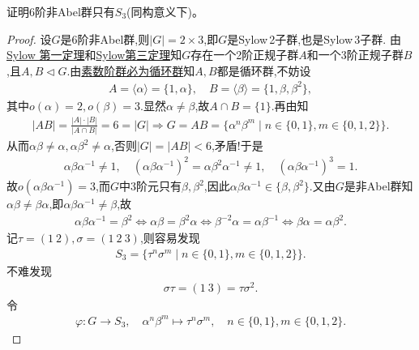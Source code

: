 \documentclass[../../main.tex]{subfiles}%
\begin{document}
\begin{example}
证明6阶非Abel群只有$S_3$(同构意义下)。
\end{example}
\begin{proof}

设$G$是6阶非Abel群,则$|G|=2\times 3$,即$G$是Sylow$\,$2子群,也是Sylow$\,$3子群.
由\hyperref[theorem:Sylow 第一定理]{Sylow 第一定理}和\hyperref[theorem:Sylow第三定理]{Sylow第三定理}知$G$存在一个2阶正规子群$A$和一个3阶正规子群$B$,且$A,B\lhd G$.由\hyperref[proposition:素数阶群必为循环群]{素数阶群必为循环群}知$A,B$都是循环群,不妨设
\begin{align*}
A=\langle \alpha \rangle =\{ 1,\alpha \} ,\quad B=\langle \beta \rangle =\{ 1,\beta ,\beta^2 \} ,
\end{align*}
其中$o(\alpha)=2,o(\beta)=3$.显然$\alpha \ne \beta$,故$A\cap B=\{ 1 \}$.再由知
\begin{align*}
|AB|=\frac{|A|\cdot |B|}{|A\cap B|}=6=|G|\Longrightarrow G=AB=\{ \alpha^n\beta^m\mid n\in \{ 0,1 \} ,m\in \{ 0,1,2 \} \} .
\end{align*}
从而$\alpha \beta \ne \alpha ,\alpha \beta^2\ne \alpha$,否则$|G|=|AB|<6$,矛盾!于是
\begin{align*}
\alpha \beta \alpha^{-1}\ne 1,\quad (\alpha \beta \alpha^{-1})^2=\alpha \beta^2\alpha^{-1}\ne 1,\quad (\alpha \beta \alpha^{-1})^3=1.
\end{align*}
故$o(\alpha \beta \alpha^{-1})=3$,而$G$中3阶元只有$\beta ,\beta^2$,因此$\alpha \beta \alpha^{-1}\in \{ \beta ,\beta^2 \} $.又由$G$是非Abel群知$\alpha \beta \ne \beta \alpha$,即$\alpha \beta \alpha^{-1}\ne \beta$,故
\begin{align}
\alpha \beta \alpha^{-1}=\beta^2\Longleftrightarrow \alpha \beta =\beta^2\alpha \Longleftrightarrow \beta^{-2}\alpha =\alpha \beta^{-1}\Longleftrightarrow \beta \alpha =\alpha \beta^2.
\label{eq::--HUHFWIUQQH1}
\end{align}
记$\tau=(1\ 2),\sigma=(1\ 2\ 3)$,则容易发现
\begin{align*}
S_3=\{ \tau^n\sigma^m\mid n\in \{ 0,1 \} ,m\in \{ 0,1,2 \} \} .
\end{align*}
不难发现
\begin{align}
\sigma \tau=(1\ 3)=\tau \sigma^2.
\label{eq::--HUHFWIUQQH2}
\end{align}
令
\begin{align*}
\varphi :G\rightarrow S_3,\quad \alpha^n\beta^m\mapsto \tau^n\sigma^m,\quad n\in \{ 0,1 \} ,m\in \{ 0,1,2 \} .
\end{align*}

\end{proof}
\end{document}
